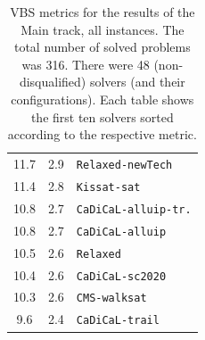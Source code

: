 \documentclass{elsarticle}
\newcommand{\solver}[1]{\texttt{#1}}
\begin{document}
\begin{table}
\begin{tabular}{ccl}
11.7 & 2.9 & \solver{Relaxed-newTech} \\
11.4 & 2.8 & \solver{Kissat-sat} \\
10.8 & 2.7 & \solver{CaDiCaL-alluip-tr.} \\
10.8 & 2.7 & \solver{CaDiCaL-alluip} \\
10.5 & 2.6 & \solver{Relaxed} \\
10.4 & 2.6 & \solver{CaDiCaL-sc2020} \\
10.3 & 2.6 & \solver{CMS-walksat} \\
\phantom{0}9.6 & 2.4 & \solver{CaDiCaL-trail} \\
\end{tabular}
\caption{VBS metrics for the results of the Main track, all instances. 
The total number of solved problems was 316. 
There were 48 (non-disqualified) solvers (and their configurations).
Each table shows the first ten solvers sorted according to the respective metric.}
\label{tab:vbsMainALL}
\end{table}
\end{document}
